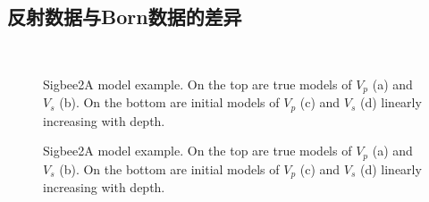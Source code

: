 \subsection{反射数据与Born数据的差异}
\begin{figure}
   \centering
   \\
   \caption{Sigbee2A model example. On the top are true models of 
   $V_p$ (a) and $V_s$ (b). On the bottom are initial models of $V_p$ (c) and $V_s$
   (d) linearly increasing with depth. }
   \label{fig:refl_born_comparison}
\end{figure}
\begin{figure}
   \centering
   \caption{Sigbee2A model example. On the top are true models of 
   $V_p$ (a) and $V_s$ (b). On the bottom are initial models of $V_p$ (c) and $V_s$
   (d) linearly increasing with depth. }
   \label{fig:TrueAndInitial_1}
\end{figure}

